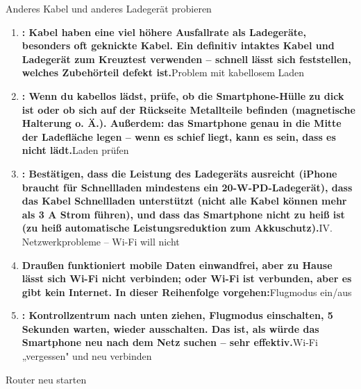 Anderes Kabel und anderes Ladegerät probieren

\begin{enumerate}
  \item \textbf{: Kabel haben eine viel höhere Ausfallrate als Ladegeräte, besonders oft geknickte Kabel. Ein definitiv intaktes Kabel und Ladegerät zum Kreuztest verwenden – schnell lässt sich feststellen, welches Zubehörteil defekt ist.}Problem mit kabellosem Laden
  \item \textbf{: Wenn du kabellos lädst, prüfe, ob die Smartphone-Hülle zu dick ist oder ob sich auf der Rückseite Metallteile befinden (magnetische Halterung o. Ä.). Außerdem: das Smartphone genau in die Mitte der Ladefläche legen – wenn es schief liegt, kann es sein, dass es nicht lädt.}Laden prüfen
  \item \textbf{: Bestätigen, dass die Leistung des Ladegeräts ausreicht (iPhone braucht für Schnellladen mindestens ein 20-W-PD-Ladegerät), dass das Kabel Schnellladen unterstützt (nicht alle Kabel können mehr als 3 A Strom führen), und dass das Smartphone nicht zu heiß ist (zu heiß automatische Leistungsreduktion zum Akkuschutz).}IV. Netzwerkprobleme – Wi-Fi will nicht
  \item \textbf{Draußen funktioniert mobile Daten einwandfrei, aber zu Hause lässt sich Wi-Fi nicht verbinden; oder Wi-Fi ist verbunden, aber es gibt kein Internet. In dieser Reihenfolge vorgehen:}Flugmodus ein/aus
  \item \textbf{: Kontrollzentrum nach unten ziehen, Flugmodus einschalten, 5 Sekunden warten, wieder ausschalten. Das ist, als würde das Smartphone neu nach dem Netz suchen – sehr effektiv.}Wi-Fi „vergessen" und neu verbinden
\end{enumerate}


Router neu starten

